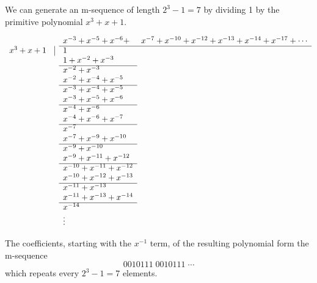 {%
\begin{example}
\label{ex:1/p(x)}
We can generate an m-sequence of length
$2^3-1=7$ by dividing 1 by the primitive polynomial $x^3+x+1$.




\begin{fsL}
\[
\begin{array}{rrll}
           &   & x^{-3} + x^{-5} + x^{-6} +& x^{-7} + x^{-10} + x^{-12} + x^{-13} + x^{-14} + x^{-17} + \cdots \\
   \cline{3-4}
   x^3+x+1 & \vline & 1 \\
           &        & 1 + x^{-2} + x^{-3} \\
   \cline{3-3}
           &        & x^{-2} + x^{-3} \\
           &        & x^{-2} + x^{-4} + x^{-5} \\
   \cline{3-3}
           &        & x^{-3} + x^{-4} + x^{-5} \\
           &        & x^{-3} + x^{-5} + x^{-6} \\
   \cline{3-3}
           &        & x^{-4} + x^{-6}          \\
           &        & x^{-4} + x^{-6} + x^{-7} \\
   \cline{3-3}
           &        & x^{-7}                   \\
           &        & x^{-7} + x^{-9} + x^{-10} \\
   \cline{3-3}
           &        & x^{-9} + x^{-10}         \\
           &        & x^{-9} + x^{-11} + x^{-12} \\
   \cline{3-3}
           &        & x^{-10} + x^{-11} + x^{-12} \\
           &        & x^{-10} + x^{-12} + x^{-13} \\
   \cline{3-3}
           &        & x^{-11} + x^{-13}          \\
           &        & x^{-11} + x^{-13} + x^{-14} \\
   \cline{3-3}
           &        & x^{-14}           \\
           &        & \vdots
\end{array}
\]
\end{fsL}
The coefficients, starting with the $x^{-1}$ term,
of the resulting polynomial form the m-sequence
\[ 0010111 \; 0010111 \; \cdots \]
which repeats every $2^3-1=7$ elements.
\end{example}


}
